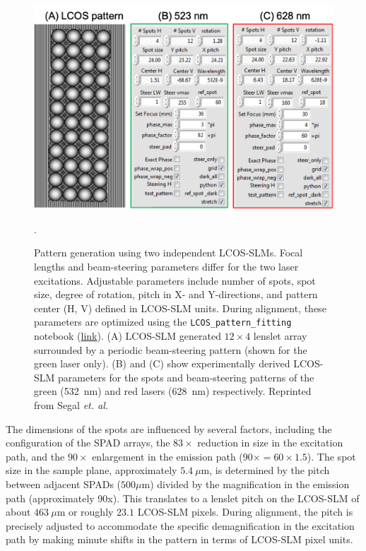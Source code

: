 \begin{figure}
\centering
\includegraphics[width=\linewidth]{chapters/figures/LCOS_GUI.png}
\caption{\label{fig:LCOS_params} Pattern generation
using two independent \ac{LCOS-SLM}s.
Focal lengths and beam-steering parameters differ for the two laser excitations.
Adjustable parameters include number of spots, spot size, degree of rotation, pitch in X- and Y-directions, and pattern center (H, V) defined in \ac{LCOS-SLM} units. 
During alignment, these parameters are optimized using the \texttt{LCOS\_pattern\_fitting} notebook
(\href{https://github.com/tritemio/48-spot-smFRET-PAX-analysis/tree/master/alignment/2017-04-28/pattern_profiling}{link}).
(A) \ac{LCOS-SLM} generated $12\times4$ lenslet array 
surrounded by a periodic beam-steering pattern (shown for the green laser only). 
(B) and (C) show experimentally derived \ac{LCOS-SLM} parameters for the spots and beam-steering patterns of the green (532~nm) and red lasers (628~nm) respectively.
Reprinted from Segal \textit{et. al.}~\cite{segal_methods_2019}}.
\end{figure}

The dimensions of the spots are influenced by several factors, including the configuration of the \ac{SPAD} arrays, the $83\times$ reduction in size in the excitation path, and the $90\times$ enlargement in the emission path ($90\times = 60\times1.5$). 
The spot size in the sample plane, approximately $5.4~\mu$m, is determined by the pitch between adjacent \ac{SPAD}s ($500\mu$m) divided by the magnification in the emission path (approximately 90x). 
This translates to a lenslet pitch on the \ac{LCOS-SLM} of about $463~\mu$m or roughly $23.1$ \ac{LCOS-SLM} pixels. 
During alignment, the pitch is precisely adjusted to accommodate the specific demagnification in the excitation path by making minute shifts in the pattern in terms of \ac{LCOS-SLM} pixel units.

